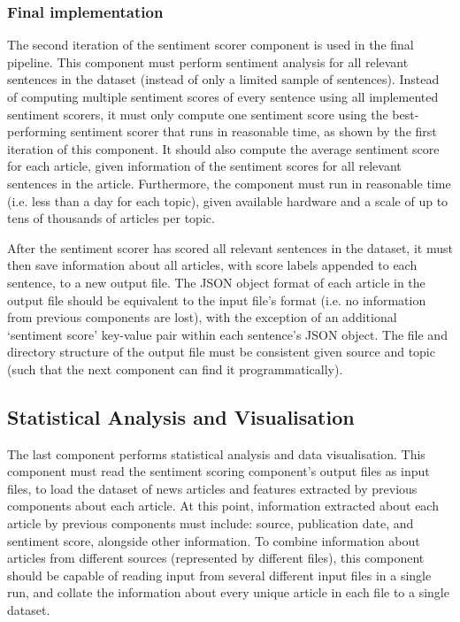 \documentclass{report}
\begin{document}
\subsubsection{Final implementation} \label{req-sentiment-final}

The second iteration of the sentiment scorer component is used in the final pipeline.
This component must perform sentiment analysis for all relevant sentences in the dataset (instead of only a limited sample of sentences).
Instead of computing multiple sentiment scores of every sentence using all implemented sentiment scorers, it must only compute one sentiment score using the best-performing sentiment scorer that runs in reasonable time, as shown by the first iteration of this component.
It should also compute the average sentiment score for each article, given information of the sentiment scores for all relevant sentences in the article.
Furthermore, the component must run in reasonable time (i.e. less than a day for each topic), given available hardware and a scale of up to tens of thousands of articles per topic.

After the sentiment scorer has scored all relevant sentences in the dataset, it must then save information about all articles, with score labels appended to each sentence, to a new output file.
The JSON object format of each article in the output file should be equivalent to the input file's format (i.e. no information from previous components are lost), with the exception of an additional `sentiment score' key-value pair within each sentence's JSON object.
The file and directory structure of the output file must be consistent given source and topic (such that the next component can find it programmatically).

\subsection{Statistical Analysis and Visualisation} \label{req-visualisation}

The last component performs statistical analysis and data visualisation.
This component must read the sentiment scoring component's output files as input files, to load the dataset of news articles and features extracted by previous components about each article.
At this point, information extracted about each article by previous components must include: source, publication date, and sentiment score, alongside other information.
To combine information about articles from different sources (represented by different files), this component should be capable of reading input from several different input files in a single run, and collate the information about every unique article in each file to a single dataset.
\end{document}
